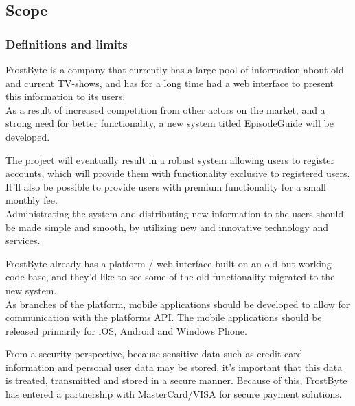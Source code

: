 \subsection{Scope}
\subsubsection{Definitions and limits}

FrostByte is a company that currently has a large pool of information about old and current TV-shows, and has for a long time had a web interface to present this information to its users.\\
As a result of increased competition from other actors on the market, and a strong need for better functionality, a new system titled EpisodeGuide will be developed.

The project will eventually result in a robust system allowing users to register accounts, which will provide them with functionality exclusive to registered users.\\
It’ll also be possible to provide users with premium functionality for a small monthly fee.\\
Administrating the system and distributing new information to the users should be made simple and smooth, by utilizing new and innovative technology and services. 

FrostByte already has a platform / web-interface built on an old but working code base, and they’d like to see some of the old functionality migrated to the new system.\\
As branches of the platform, mobile applications should be developed to allow for communication with the platforms API. The mobile applications should be released primarily for iOS, Android and Windows Phone.

From a security perspective, because sensitive data such as credit card information and personal user data may be stored, it’s important that this data is treated, transmitted and stored in a secure manner. Because of this, FrostByte has entered a partnership with MasterCard/VISA for secure payment solutions.

